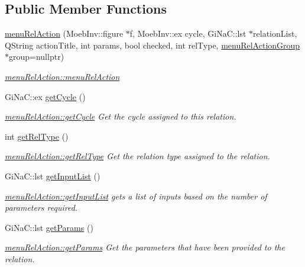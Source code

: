 \subsection*{Public Member Functions}
\begin{DoxyCompactItemize}
\item 
\mbox{\hyperlink{classmenu_rel_action_a2db14a6cd576e8cb645a0e1dcf584d4e}{menu\+Rel\+Action}} (Moeb\+Inv\+::figure $\ast$f, Moeb\+Inv\+::ex cycle, Gi\+Na\+C\+::lst $\ast$relation\+List, Q\+String action\+Title, int params, bool checked, int rel\+Type, \mbox{\hyperlink{classmenu_rel_action_group}{menu\+Rel\+Action\+Group}} $\ast$group=nullptr)
\begin{DoxyCompactList}\small\item\em \mbox{\hyperlink{classmenu_rel_action_a2db14a6cd576e8cb645a0e1dcf584d4e}{menu\+Rel\+Action\+::menu\+Rel\+Action}} \end{DoxyCompactList}\item 
Gi\+Na\+C\+::ex \mbox{\hyperlink{classmenu_rel_action_acb80ac433c901f22dbddcff7445adf24}{get\+Cycle}} ()
\begin{DoxyCompactList}\small\item\em \mbox{\hyperlink{classmenu_rel_action_acb80ac433c901f22dbddcff7445adf24}{menu\+Rel\+Action\+::get\+Cycle}} Get the cycle assigned to this relation. \end{DoxyCompactList}\item 
int \mbox{\hyperlink{classmenu_rel_action_a1092ced0a224fdb4c8f5a0b12548a120}{get\+Rel\+Type}} ()
\begin{DoxyCompactList}\small\item\em \mbox{\hyperlink{classmenu_rel_action_a1092ced0a224fdb4c8f5a0b12548a120}{menu\+Rel\+Action\+::get\+Rel\+Type}} Get the relation type assigned to the relation. \end{DoxyCompactList}\item 
Gi\+Na\+C\+::lst \mbox{\hyperlink{classmenu_rel_action_a8ec0134231f519695901fa4d750fab4a}{get\+Input\+List}} ()
\begin{DoxyCompactList}\small\item\em \mbox{\hyperlink{classmenu_rel_action_a8ec0134231f519695901fa4d750fab4a}{menu\+Rel\+Action\+::get\+Input\+List}} gets a list of inputs based on the number of parameters required. \end{DoxyCompactList}\item 
Gi\+Na\+C\+::lst \mbox{\hyperlink{classmenu_rel_action_a8da5cc4f4063d4ea465d67b0aabc57e7}{get\+Params}} ()
\begin{DoxyCompactList}\small\item\em \mbox{\hyperlink{classmenu_rel_action_a8da5cc4f4063d4ea465d67b0aabc57e7}{menu\+Rel\+Action\+::get\+Params}} Get the parameters that have been provided to the relation. \end{DoxyCompactList}\item 

\end{DoxyCompactItemize}
